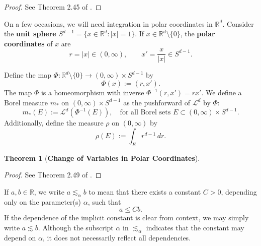 \documentclass[12pt,a4paper]{report}
\theoremstyle{definition}
\newtheorem{theorem}{Theorem}
\begin{document}
\begin{proof}
    See Theorem 2.45 of \cite{folland1999real}.
\end{proof}


On a few occasions, we will need integration in polar coordinates in $\mathbb{R}^d$. Consider the \textbf{unit sphere} \(S^{d-1} = \{x \in \mathbb{R}^d : |x| = 1\} \). If \( x \in \mathbb{R}^d \setminus \{0\} \), the \textbf{polar coordinates} of \( x \) are
\[
r = |x| \in (0, \infty), \qquad x' = \frac{x}{|x|} \in S^{d-1}.
\]

Define the map \( \Phi : \mathbb{R}^d \setminus \{0\} \to (0, \infty) \times S^{d-1} \) by
\[
\Phi(x) := (r, x').
\]
The map $\Phi$ is a homeomorphism with inverse \( \Phi^{-1}(r, x') = r x' \).  We define a Borel measure \( m_* \) on \( (0, \infty) \times S^{d-1} \) as the pushforward of \( \mathcal{L}^d \) by \( \Phi \):
\[
m_*(E) := \mathcal{L}^d(\Phi^{-1}(E)), \quad \text{for all Borel sets } E \subset (0, \infty) \times S^{d-1}.
\]
Additionally, define the measure \( \rho \) on \( (0, \infty) \) by
\[
\rho(E) := \int_E r^{d-1} \, dr.
\]


\begin{theorem}[\textbf{Change of Variables in Polar Coordinates}] \label{polar}
\leavevmode
{}
\end{theorem}

\begin{proof}
    See Theorem 2.49 of \cite{folland1999real}.
\end{proof}

If $a, b \in \mathbb{R}$, we write \( a \lesssim_\alpha b \) to mean that there exists a constant \( C > 0 \), depending only on the parameter(s) \( \alpha \), such that
\[
a \leq C b.
\]
If the dependence of the implicit constant is clear from context, we may simply write \( a \lesssim b \). Although the subscript \( \alpha \) in \( \lesssim_\alpha \) indicates that the constant may depend on \( \alpha \), it does not necessarily reflect all dependencies.
\end{document}
